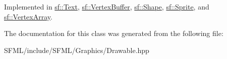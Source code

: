 Implemented in \mbox{\hyperlink{classsf_1_1_text_a42f0cd394f76f4c0998114918cb3f11c}{sf\+::\+Text}}, \mbox{\hyperlink{classsf_1_1_vertex_buffer_a3591a7fd52f502033b40755af71edc17}{sf\+::\+Vertex\+Buffer}}, \mbox{\hyperlink{classsf_1_1_shape_af335b88097f1db83afdfafa0cd66d04d}{sf\+::\+Shape}}, \mbox{\hyperlink{classsf_1_1_sprite_ad6ab20148c4ba6d6fc33a4aaf5eb838b}{sf\+::\+Sprite}}, and \mbox{\hyperlink{classsf_1_1_vertex_array_aa461f084e4a65fabfa4992885dabbea6}{sf\+::\+Vertex\+Array}}.



The documentation for this class was generated from the following file\+:\begin{DoxyCompactItemize}
\item 
S\+F\+M\+L/include/\+S\+F\+M\+L/\+Graphics/Drawable.\+hpp\end{DoxyCompactItemize}
